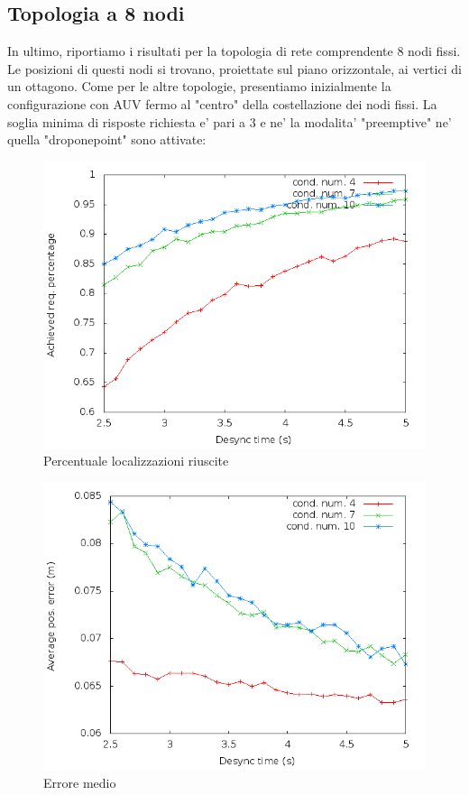 \subsection{Topologia a 8 nodi}
In ultimo, riportiamo i risultati per la topologia di rete comprendente 8 nodi fissi. Le posizioni di questi nodi si trovano, proiettate sul piano orizzontale, ai vertici di un ottagono.
Come per le altre topologie, presentiamo inizialmente la configurazione con AUV fermo al "centro" della costellazione dei nodi fissi. La soglia minima di risposte richiesta e' pari a 3 e ne' la modalita' "preemptive" ne' quella "droponepoint" sono attivate:
\begin{figure}[H]
    \centering
    \includegraphics[scale=0.5]{octagonsimulation/achievedlocreq3preempt0drop0speed0.png}
    \caption{Percentuale localizzazioni riuscite}
    \label{fig:octagonsimulation/achievedlocreq3preempt0drop0speed0}
\end{figure}
\begin{figure}[H]
    \centering
    \includegraphics[scale=0.5]{octagonsimulation/avposerrorreq3preempt0drop0speed0.png}
    \caption{Errore medio}
    \label{fig:octagonsimulation/avposerrorreq3preempt0drop0speed0}
\end{figure}
